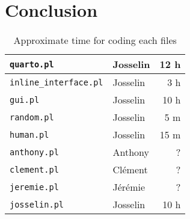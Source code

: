 \documentclass[a4paper,12pt]{article}
\newcommand{\tw}[1]{\texttt{#1}}
\newcommand{\mytable}[3]{
	\begin{table}[ht]
		\begin{center}
			\begin{tabular}{#2}
				#3
			\end{tabular}
		\caption{#1}
		\end{center}
	\end{table}
}
\begin{document}
	
	\section{Conclusion}

		\mytable{Approximate time for coding each files}{|l||l|r|}{\hline
			\tw{quarto.pl}				& Josselin		& 12 h		\\\hline
			\tw{inline\_interface.pl}	& Josselin		& 3 h		\\\hline
			\tw{gui.pl}					& Josselin		& 10 h		\\\hline
			\tw{random.pl}				& Josselin		& 5 m		\\\hline
			\tw{human.pl}				& Josselin		& 15 m		\\\hline
			\tw{anthony.pl}				& Anthony		& ?			\\\hline
			\tw{clement.pl}				& Clément		& ?			\\\hline
			\tw{jeremie.pl}				& Jérémie		& ?			\\\hline
			\tw{josselin.pl}			& Josselin		& 10 h		\\\hline
		}
\end{document}
